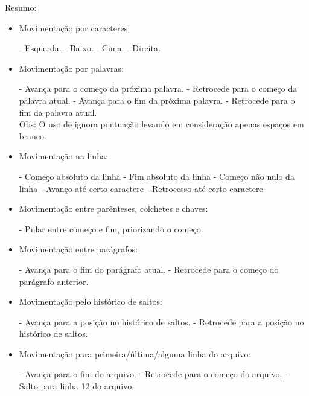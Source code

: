 Resumo:
\begin{itemize}
    \item Movimentação por caracteres:

        \subitem {} - Esquerda.
        \subitem {} - Baixo.
        \subitem {} - Cima.
        \subitem {} - Direita.

    \item Movimentação por palavras:

        \subitem {}  - Avança para o começo da próxima palavra.
        \subitem {}  - Retrocede para o começo da palavra atual.
        \subitem {} - Avança para o fim da próxima palavra.
        \subitem {} - Retrocede para o fim da palavra atual.\\
        Obs: O uso de  ignora pontuação levando em consideração apenas espaços em branco.

    \item Movimentação na linha:

        \subitem {} - Começo absoluto da linha
        \subitem \vimcommand{\$} - Fim absoluto da linha
        \subitem \vimcommand{\^} - Começo não nulo da linha
        \subitem {} - Avanço até certo caractere
        \subitem {} - Retrocesso até certo caractere

    \item Movimentação entre parênteses, colchetes e chaves:

        \subitem \vimcommand{\%} - Pular entre começo e fim, priorizando o começo.

    \item Movimentação entre parágrafos:

        \subitem \vimcommand{\}} - Avança para o fim do parágrafo atual.
        \subitem \vimcommand{\{} - Retrocede para o começo do parágrafo anterior.

    \item Movimentação pelo histórico de saltos:

        \subitem {} - Avança para a posição no histórico de saltos.
        \subitem {} - Retrocede para a posição no histórico de saltos.

    \item Movimentação para primeira/última/alguma linha do arquivo:

        \subitem {} - Avança para o fim do arquivo.
        \subitem {} - Retrocede para o começo do arquivo.
        \subitem {} - Salto para linha 12 do arquivo.

\end{itemize}
    
